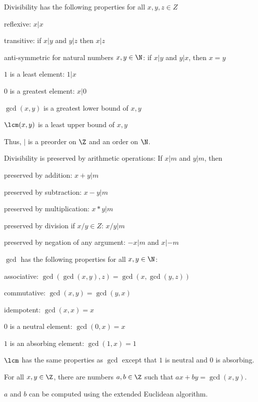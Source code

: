 \begin{theorem}[Divisibility]
Divisibility has the following properties for all $x,y,z\in Z$
\begin{compactitem}
\item reflexive: $x|x$
\item transitive: if $x|y$ and $y|z$ then $x|z$
\item anti-symmetric for natural numbers $x,y\in \N$: if $x|y$ and $y|x$, then $x=y$
\item $1$ is a least element: $1|x$
\item $0$ is a greatest element: $x|0$
\item $\gcd(x,y)$ is a greatest lower bound of $x,y$
\item $\lcm(x,y)$ is a least upper bound of $x,y$
\end{compactitem}
Thus, $|$ is a preorder on $\Z$ and an order on $\N$.
\medskip

Divisibility is preserved by arithmetic operations: If $x|m$ and $y|m$, then
\begin{compactitem}
\item preserved by addition: $x+y|m$
\item preserved by subtraction: $x-y|m$
\item preserved by multiplication: $x*y|m$
\item preserved by division if $x/y\in Z$: $x/y|m$
\item preserved by negation of any argument: $-x|m$ and $x|-m$
\end{compactitem}
\medskip

$\gcd$ has the following properties for all $x,y\in\N$:
\begin{compactitem}
\item associative: $\gcd(\gcd(x,y),z)=\gcd(x,\gcd(y,z))$
\item commutative: $\gcd(x,y)=\gcd(y,x)$
\item idempotent: $\gcd(x,x)=x$
\item $0$ is a neutral element: $\gcd(0,x)=x$
\item $1$ is an absorbing element: $\gcd(1,x)=1$
\end{compactitem}
$\lcm$ has the same properties as $\gcd$ except that $1$ is neutral and $0$ is absorbing.
\end{theorem}

\begin{theorem}\label{thm:math:extendedeuclid}
For all $x,y\in\Z$, there are numbers $a,b\in\Z$ such that $ax+by=\gcd(x,y)$.

$a$ and $b$ can be computed using the extended Euclidean algorithm.
\end{theorem}

